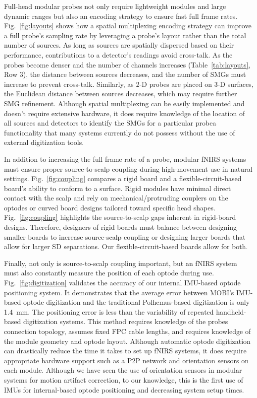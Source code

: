 Full-head modular probes not only require lightweight modules and large dynamic ranges but also an encoding strategy to ensure fast full frame rates. Fig.~\ref{fig:layouts} shows how a spatial multiplexing encoding strategy can improve a full probe's sampling rate by leveraging a probe's layout rather than the total number of sources. As long as sources are spatially dispersed based on their performance, contributions to a detector's readings avoid cross-talk. As the probes become denser and the number of channels increases (Table~\ref{tab:layouts}, Row 3), the distance between sources decreases, and the number of \ac{SMG}s must increase to prevent cross-talk. Similarly, as 2-D probes are placed on 3-D surfaces, the Euclidean distance between sources decreases, which may require further \ac{SMG} refinement. Although spatial multiplexing can be easily implemented and doesn't require extensive hardware, it does require knowledge of the location of all sources and detectors to identify the \ac{SMG}s for a particular probe\textemdash a functionality that many systems currently do not possess without the use of external digitization tools.  

In addition to increasing the full frame rate of a probe, modular \ac{fNIRS} systems must ensure proper source-to-scalp coupling during high-movement use in natural settings. Fig.~\ref{fig:coupling} compares a rigid board and a flexible-circuit-based board's ability to conform to a surface. Rigid modules have minimal direct contact with the scalp and rely on mechanical/protruding couplers on the optodes or curved board designs tailored toward specific head shapes. Fig.~\ref{fig:coupling} highlights the source-to-scalp gaps inherent in rigid-board designs. Therefore, designers of rigid boards must balance between designing smaller boards to increase source-scalp coupling or designing larger boards that allow for larger \ac{SD} separations. Our flexible-circuit-based boards allow for both. 

Finally, not only is source-to-scalp coupling important, but an \ac{fNIRS} system must also constantly measure the position of each optode during use. Fig.~\ref{fig:digitization} validates the accuracy of our internal \ac{IMU}-based optode positioning system. It demonstrates that the average error between \ac{MOBI}'s \ac{IMU}-based optode digitization and the traditional Polhemus-based digitization is only 1.4~mm. The positioning error is less than the variability of repeated handheld-based digitization systems. This method requires knowledge of the probes connection topology, assumes fixed \ac{FPC} cable lengths, and requires knowledge of the module geometry and optode layout. Although automatic optode digitization can drastically reduce the time it takes to set up \ac{fNIRS} systems, it does require appropriate hardware support such as a \ac{P2P} network and orientation sensors on each module. Although we have seen the use of orientation sensors in modular systems for motion artifact correction, to our knowledge, this is the first use of \ac{IMU}s for internal-based optode positioning and decreasing system setup times.

